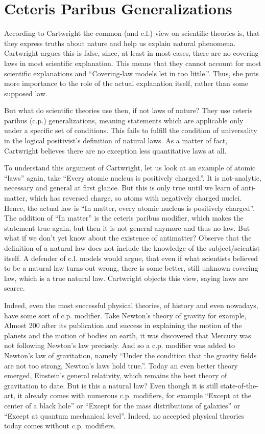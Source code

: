 \section*{Ceteris Paribus Generalizations}
According to Cartwright the common (and c.l.) view on scientific theories is, that they
express truths about nature and help us explain natural phenomena.
Cartwright argues this is false, since, at least in most cases, there are no covering laws
in most scientific explanation.
This means that they cannot account for most scientific explanations and
\enquote{Covering-law models let in too little.}\cite[2]{cartwright1980truth}.
Thus, she puts more importance to the role of the actual explanation itself,
rather than some supposed law.

But what do scientific theories use then, if not laws of nature?
They use ceteris paribus (c.p.) generalizations, meaning
statements which are applicable only under a specific set of conditions.
This fails to fulfill the condition of universality in the
logical positivist's
definition of natural laws.
As a matter of fact, Cartwright believes there are no
exception less quantitative laws at all.

To understand this argument of Cartwright, let us look at an example
of atomic \enquote{laws} again, take \enquote{Every atomic nucleus is positively charged.}.
It is not-analytic, necessary and general at first glance. But this is only true until we
learn of anti-matter, which has reversed charge, so atoms with negatively charged nuclei.
Hence, the actual law is \enquote{In matter, every atomic nucleus is positively charged}.
The addition of \enquote{In matter} is the ceteris paribus modifier, which makes the statement
true again, but then it is not general anymore and thus no law.
But what if we don't yet know about the existence of antimatter?
Observe that the definition
of a natural law does not include the knowledge of the subject/scientist itself.
A defender of c.l. models would argue, that even if what scientists believed to be a
natural law turns out wrong, there is some better, still unknown covering law, which is a true
natural law.
Cartwright objects this view, saying laws are scarce.

Indeed, even the most successful physical theories, of history and even nowadays,
have some sort of c.p. modifier.
Take Newton's theory of gravity for example,
Almost 200 after its publication and success in explaining the motion of the planets and
the motion of bodies on earth, it was discovered that Mercury was not following
Newton's law precisely. And so a c.p. modifier was added to
Newton's law of gravitation, namely \enquote{Under the condition that the gravity fields are not too strong,
    Newton's laws hold true.}.
Today an even better theory emerged, Einstein's general relativity, which remains
the best theory of gravitation to date. But is this a natural law?
Even though it is still state-of-the-art, it already comes with numerous c.p.
modifiers, for example \enquote{Except at the center of a black hole} or
\enquote{Except for the mass distributions of galaxies} or \enquote{Except at quantum mechanical level}.
Indeed, no accepted physical theories today comes without c.p. modifiers.